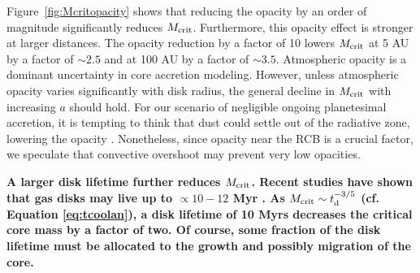 \documentclass[apj, numberedappendix]{emulateapj}
\newcommand{\Eq}[1]{Equation\,(\ref{#1})}
\newcommand{\Fig}[1]{Figure~\ref{#1}}
\newcommand{\RH}{R_{\rm H}}
\newcommand{\di}{_{\rm d}}
\newcommand{\MC}{M_{\rm crit}}
\begin{document}
\Fig{fig:Mcritopacity} shows that reducing the opacity by an order of magnitude significantly reduces $\MC$.  Furthermore, this opacity effect is stronger at larger distances.  The opacity reduction by a factor of 10 lowers $\MC$ at 5 AU by a factor of $\sim$$2.5$ and at 100 AU by a factor of $\sim$$3.5$.  Atmospheric opacity is a dominant uncertainty in core accretion modeling.  However, unless atmospheric opacity varies significantly with disk radius, the general decline in $\MC$ with increasing $a$ should hold.  For our scenario of negligible ongoing planetesimal accretion, it is tempting to think that dust could settle out of the radiative zone, lowering the opacity \citep{podolak03}.  Nonetheless, since opacity near the RCB is a crucial factor, we speculate that convective overshoot may prevent very low opacities.

\textbf{A larger disk lifetime further reduces $M_{\rm crit}$. Recent studies have shown that gas disks may live up to $\propto$$10-12$ Myr \citep{bell13}. As $M_{\rm crit} \sim t\di^{-3/5}$ (cf. Equation \ref{eq:tcoolan}), a disk lifetime of 10 Myrs decreases the critical core mass by a factor of two.  Of course, some fraction of the disk lifetime must be allocated to the growth and possibly migration of the core.} 





%
\end{document}
